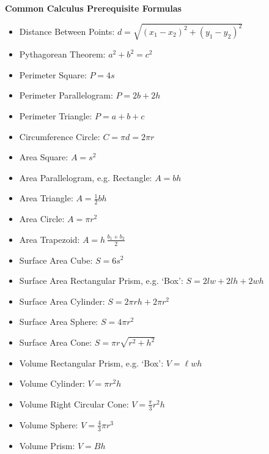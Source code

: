 \documentclass[11pt,letterpaper]{article}
\begin{document}
\begin{center} {\bfseries\LARGE Common Calculus Prerequisite Formulas} \end{center} \par\vspace{1cm}

	\begin{itemize}
	\item Distance Between Points: $d= \sqrt{(x_1 - x_2)^2 + (y_1 - y_2)^2}$
	\item Pythagorean Theorem: $a^2 + b^2= c^2$
	\item Perimeter Square: $P= 4s$
	\item Perimeter Parallelogram: $P= 2b + 2h$
	\item Perimeter Triangle: $P= a + b + c$
	\item Circumference Circle: $C= \pi d= 2 \pi r$
	\end{itemize} \vfill

	\begin{itemize}
	\item Area Square: $A= s^2$
	\item Area Parallelogram, e.g. Rectangle: $A= bh$
	\item Area Triangle: $A= \frac{1}{2} bh$
	\item Area Circle: $A= \pi r^2$
	\item Area Trapezoid: $A= h\, \frac{b_1 + b_2}{2}$
	\end{itemize} \vfill

	\begin{itemize}
	\item Surface Area Cube: $S= 6s^2$
	\item Surface Area Rectangular Prism, e.g. `Box': $S= 2lw + 2lh + 2wh$
	\item Surface Area Cylinder: $S= 2\pi rh + 2\pi r^2$
	\item Surface Area Sphere: $S= 4\pi r^2$
	\item Surface Area Cone: $S= \pi r \sqrt{r^2 + h^2}$
	\end{itemize} \vfill

	\begin{itemize}
	\item Volume Rectangular Prism, e.g. `Box': $V= \ell w h$
	\item Volume Cylinder: $V= \pi r^2 h$
	\item Volume Right Circular Cone: $V= \frac{\pi}{3} r^2 h$
	\item Volume Sphere: $V= \frac{4}{3} \pi r^3$
	\item Volume Prism: $V= Bh$
	\end{itemize} \vfill
\end{document}
